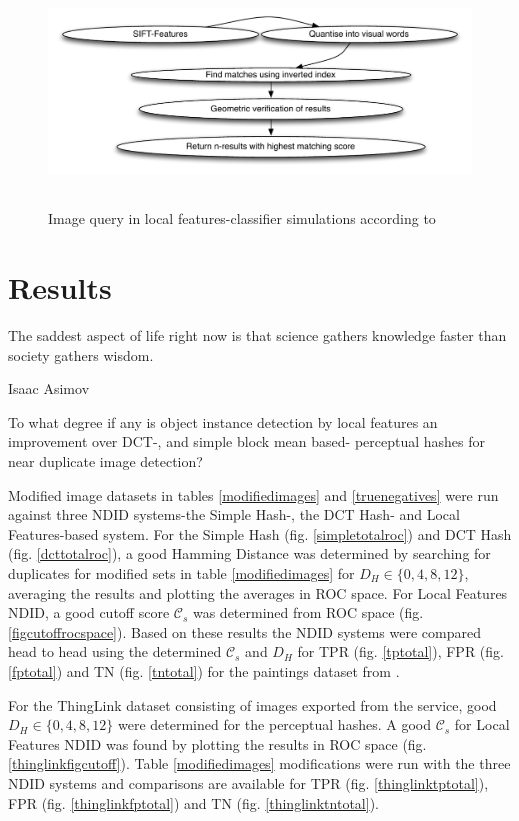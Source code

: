 \documentclass[english,12pt,a4paper,pdftex,elec,utf8]{aaltothesis}
\begin{document}
\begin{figure}[htb]
\begin{center}
\includegraphics[height=6cm]{figures/vedaldiquery}
\end{center}
\caption{Image query in local features-classifier simulations according to \cite{Vedaldi2012}}
\label{vedaldiquery}
\end{figure}

\clearpage

\section{Results}
\epigraph{The saddest aspect of life right now is that science gathers knowledge faster than society gathers wisdom.}{Isaac Asimov}
To what degree if any is object instance detection by local features an improvement over DCT-, and simple block mean based- perceptual hashes for near duplicate image detection?

Modified image datasets in tables \ref{modifiedimages} and \ref{truenegatives} were run against three NDID systems-the Simple Hash-, the DCT Hash- and Local Features-based system. For the Simple Hash (fig. \ref{simpletotalroc}) and DCT Hash (fig. \ref{dcttotalroc}), a good Hamming Distance was determined by searching for duplicates for modified sets in table \ref{modifiedimages} for $D_H \in \{0,4,8,12\}$, averaging the results and plotting the averages in ROC space. For Local Features NDID, a good cutoff score $\mathcal{C}_s$ was determined from ROC space (fig. \ref{figcutoffrocspace}). Based on these results the NDID systems were compared head to head using the determined $\mathcal{C}_s$ and $D_H$ for TPR (fig. \ref{tptotal}), FPR (fig. \ref{fptotal}) and TN (fig. \ref{tntotal}) for the paintings dataset from \cite{Vedaldi2012}.

For the ThingLink dataset consisting of images exported from the service, good $D_H \in \{0,4,8,12\}$ were determined for the perceptual hashes. A good $\mathcal{C}_s$ for Local Features NDID was found by plotting the results in ROC space (fig. \ref{thinglinkfigcutoff}). Table \ref{modifiedimages} modifications were run with the three NDID systems and comparisons are available for TPR (fig. \ref{thinglinktptotal}), FPR (fig. \ref{thinglinkfptotal}) and TN (fig. \ref{thinglinktntotal}).
\end{document}
